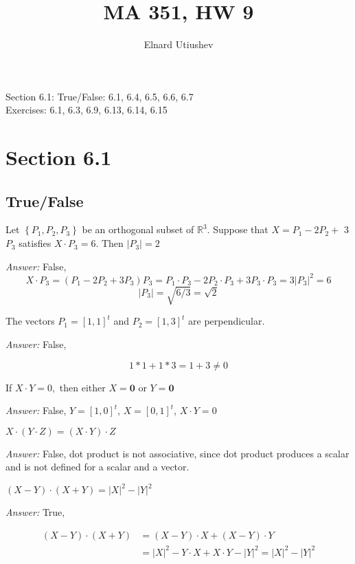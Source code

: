 \documentclass[letterpaper]{article}
\title{MA 351, HW 9}
\author{Elnard Utiushev}
\newcommand{\ans}{\textit{Answer: }}
\newenvironment{question}[2][Question]{\begin{trivlist}
\item[\hskip \labelsep {\bfseries #1}\hskip \labelsep {\bfseries #2.}]}{\end{trivlist}}
\begin{document}
\maketitle

Section 6.1: True/False: 6.1, 6.4, 6.5, 6.6, 6.7 \\
Exercises: 6.1, 6.3, 6.9, 6.13, 6.14, 6.15

\section{Section 6.1}
\subsection{True/False}

\begin{question}{6.1}
  Let $\left\{P_{1}, P_{2}, P_{3}\right\}$ be an orthogonal subset of 
  $\mathbb{R}^{3} .$ Suppose that $X=P_{1}-2 P_{2}+$
  3$P_{3}$ satisfies $X \cdot P_{3}=6 .$ Then $\left|P_{3}\right|=2$

  \ans False, 
  $$X \cdot P_3 = (P_1 - 2P_2 + 3P_3) P_3 = P_1\cdot P_3 - 2P_2\cdot P_3 + 3P_3\cdot P_3
  = 3 |P_3|^2 = 6$$
  $$|P_3| = \sqrt{6/3} = \sqrt{2}$$
\end{question}

\begin{question}{6.4}
  The vectors $P_{1}=[1,1]^{t}$ and $P_{2}=[1,3]^{t}$ are perpendicular.

  \ans False,

  $$1*1 + 1*3 = 1+3 \neq 0$$
\end{question}

\begin{question}{6.5}
  If $X \cdot Y=0,$ then either $X=\mathbf{0}$ or $Y=\mathbf{0}$
  
  \ans False, $Y = [1, 0]^t$, $X = [0, 1]^t$, $X \cdot Y = 0$
\end{question}

\begin{question}{6.6}
  $X \cdot(Y \cdot Z)=(X \cdot Y) \cdot Z$
  
  \ans False, dot product is not associative, since dot product produces a scalar 
  and is not defined for a scalar and a vector.
\end{question}

\begin{question}{6.7}
  $(X-Y) \cdot(X+Y)=|X|^{2}-|Y|^{2}$

  \ans True,

  \begin{align*}
    (X-Y) \cdot(X+Y) &= (X-Y) \cdot X + (X-Y) \cdot Y \\
    &= |X|^{2} - Y \cdot X + X \cdot Y - |Y|^{2} = |X|^{2}-|Y|^{2}
  \end{align*}
  
\end{question}
\end{document}
